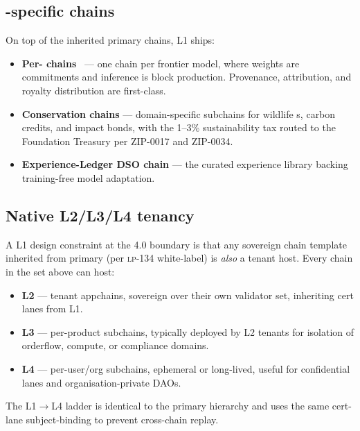 \subsection{\Zoo{}-specific chains}

On top of the inherited \Lux{} primary chains, \Zoo{} L1 ships:

\begin{itemize}[leftmargin=1.2em]
  \item \textbf{Per-\LLM{} chains}~\cite{zoo-per-llm-chains} --- one
        chain per frontier model, where weights are commitments and
        inference is block production. Provenance, attribution, and
        royalty distribution are first-class.
  \item \textbf{Conservation chains} --- domain-specific subchains
        for wildlife \NFT{}s, carbon credits, and impact bonds, with
        the 1--3\% sustainability tax routed to the Foundation
        Treasury per ZIP-0017 and ZIP-0034.
  \item \textbf{Experience-Ledger DSO chain} --- the curated
        experience library backing training-free model adaptation.
\end{itemize}

\subsection{Native L2/L3/L4 tenancy}
\label{sec:zoo-tenancy}

A \Zoo{} L1 design constraint at the 4.0 boundary is that any
sovereign chain template inherited from \Lux{} primary (per
\textsc{lp-134} white-label) is \emph{also} a tenant host. Every
\Zoo{} chain in the set above can host:

\begin{itemize}[leftmargin=1.2em]
  \item \textbf{L2} --- tenant appchains, sovereign over their own
        validator set, inheriting \Quasar{} cert lanes from \Zoo{} L1.
  \item \textbf{L3} --- per-product subchains, typically deployed by
        L2 tenants for isolation of orderflow, compute, or
        compliance domains.
  \item \textbf{L4} --- per-user/org subchains, ephemeral or
        long-lived, useful for confidential lanes and
        organisation-private DAOs.
\end{itemize}

The L1$\rightarrow$L4 ladder is identical to the \Lux{} primary
hierarchy and uses the same cert-lane subject-binding to prevent
cross-chain replay.

